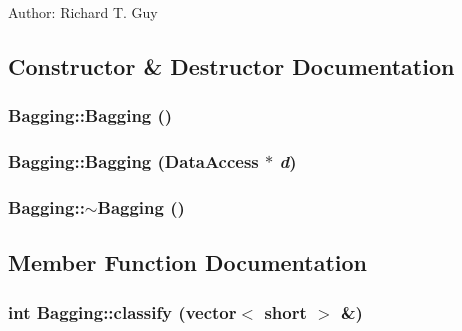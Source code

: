 Author: Richard T. Guy 

\subsection{Constructor \& Destructor Documentation}
\hypertarget{classBagging_a3af2b221856ad4c4d4e2ef06441fcc84}{
\subsubsection[{Bagging}]{\setlength{\rightskip}{0pt plus 5cm}Bagging::Bagging ()}}
\label{classBagging_a3af2b221856ad4c4d4e2ef06441fcc84}
\hypertarget{classBagging_a144056cea8677b2365c3c15e87f5d38c}{
\subsubsection[{Bagging}]{\setlength{\rightskip}{0pt plus 5cm}Bagging::Bagging ({\bf DataAccess} $\ast$ {\em d})}}
\label{classBagging_a144056cea8677b2365c3c15e87f5d38c}
\hypertarget{classBagging_a25ed2b1fad2c85b4d3e562d7a332d369}{
\subsubsection[{$\sim$Bagging}]{\setlength{\rightskip}{0pt plus 5cm}Bagging::$\sim$Bagging ()}}
\label{classBagging_a25ed2b1fad2c85b4d3e562d7a332d369}


\subsection{Member Function Documentation}
\hypertarget{classBagging_a92072d6610e9b9d932d10a123cc6ff18}{
\subsubsection[{classify}]{\setlength{\rightskip}{0pt plus 5cm}int Bagging::classify (vector$<$ short $>$ \&)}}
\label{classBagging_a92072d6610e9b9d932d10a123cc6ff18}


